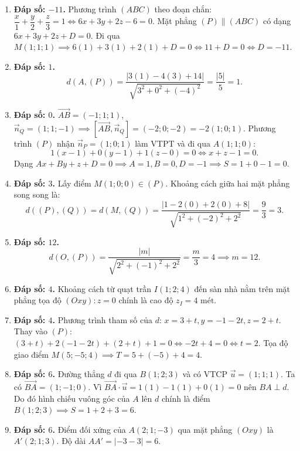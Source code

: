 \documentclass[12pt,a4paper]{article}
\begin{document}
\begin{enumerate}
\item \textbf{Đáp số: $-11$.}  
Phương trình $(ABC)$ theo đoạn chắn: $\dfrac{x}{1} + \dfrac{y}{2} + \dfrac{z}{3} = 1 \iff 6x + 3y + 2z - 6 = 0$.  
Mặt phẳng $(P) \parallel (ABC)$ có dạng $6x + 3y + 2z + D = 0$.  
Đi qua $M(1; 1; 1) \implies 6(1) + 3(1) + 2(1) + D = 0 \iff 11 + D = 0 \iff D = -11$.

\item \textbf{Đáp số: $1$.}  
\[
d(A, (P)) = \dfrac{|3(1) - 4(3) + 14|}{\sqrt{3^2 + 0^2 + (-4)^2}} = \dfrac{|5|}{5} = 1.
\]

\item \textbf{Đáp số: $0$.}  
$\vec{AB} = (-1; 1; 1)$, $\vec{n}_Q = (1; 1; -1) \implies [\vec{AB}, \vec{n}_Q] = (-2; 0; -2) = -2(1; 0; 1)$.  
Phương trình $(P)$ nhận $\vec{n}_P = (1; 0; 1)$ làm VTPT và đi qua $A(1; 1; 0)$:
\[
1(x - 1) + 0(y - 1) + 1(z - 0) = 0 \iff x + z - 1 = 0.
\]
Dạng $Ax + By + z + D = 0 \implies A = 1, B = 0, D = -1 \implies S = 1 + 0 - 1 = 0$.

\item \textbf{Đáp số: $3$.}  
Lấy điểm $M(1; 0; 0) \in (P)$. Khoảng cách giữa hai mặt phẳng song song là:
\[
d((P), (Q)) = d(M, (Q)) = \dfrac{|1 - 2(0) + 2(0) + 8|}{\sqrt{1^2 + (-2)^2 + 2^2}} = \dfrac{9}{3} = 3.
\]

\item \textbf{Đáp số: $12$.}  
\[
d(O, (P)) = \dfrac{|m|}{\sqrt{2^2 + (-1)^2 + 2^2}} = \dfrac{m}{3} = 4 \implies m = 12.
\]

\item \textbf{Đáp số: $4$.}  
Khoảng cách từ quạt trần $I(1; 2; 4)$ đến sàn nhà nằm trên mặt phẳng tọa độ $(Oxy): z = 0$ chính là cao độ $z_I = 4\text{ mét}$.

\item \textbf{Đáp số: $4$.}  
Phương trình tham số của $d$: $x = 3 + t, y = -1 - 2t, z = 2 + t$.  
Thay vào $(P)$: $(3 + t) + 2(-1 - 2t) + (2 + t) + 1 = 0 \iff -2t + 4 = 0 \iff t = 2$.  
Tọa độ giao điểm $M(5; -5; 4) \implies T = 5 + (-5) + 4 = 4$.

\item \textbf{Đáp số: $6$.}  
Đường thẳng $d$ đi qua $B(1; 2; 3)$ và có VTCP $\vec{u} = (1; 1; 1)$. Ta có $\vec{BA} = (1; -1; 0)$.  
Vì $\vec{BA} \cdot \vec{u} = 1(1) - 1(1) + 0(1) = 0$ nên $BA \perp d$.  
Do đó hình chiếu vuông góc của $A$ lên $d$ chính là điểm $B(1; 2; 3) \implies S = 1 + 2 + 3 = 6$.

\item \textbf{Đáp số: $6$.}  
Điểm đối xứng của $A(2; 1; -3)$ qua mặt phẳng $(Oxy)$ là $A'(2; 1; 3)$.  
Độ dài $AA' = |-3 - 3| = 6$.


\end{enumerate}
\end{document}
